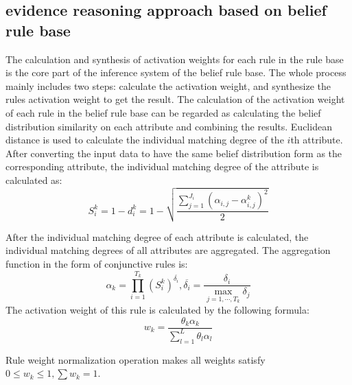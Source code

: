 \documentclass{ieeeaccess}
\begin{document}
\subsection{evidence reasoning approach based on belief rule base}
The calculation and synthesis of activation weights for each rule in the rule base is the core part of the inference system of the belief rule base.
The whole process mainly includes two steps: calculate the activation weight, and synthesize the rules activation weight to get the result.
The calculation of the activation weight of each rule in the belief rule base can be regarded as calculating the belief distribution similarity on each attribute and combining the results.
Euclidean distance is used to calculate the individual matching degree of the $i$th attribute. After converting the input data to have the same belief distribution form as the corresponding attribute,
the individual matching degree of the attribute is calculated as:
\begin{equation}
    S_i^k=1-d_i^k=1-\sqrt{\frac{\sum_{j=1}^{J_i}(\alpha_{i,j}-\alpha_{i,j}^k)^2}{2}}
\end{equation}

After the individual matching degree of each attribute is calculated, the individual matching degrees of all attributes are aggregated. The aggregation function in the form of conjunctive rules is:
\begin{equation}
    \alpha_k=\prod_{i=1}^{T_k}(S_i^k)^{\overline{\delta_i}},\overline{\delta_i}=\frac{\delta_i}{\max_{j=1,\cdots,T_k}\delta_j}
\end{equation}
The activation weight of this rule is calculated by the following formula:
\begin{equation}
    w_k=\frac{\theta_k\alpha_k}{\sum_{l=1}^L\theta_l\alpha_l}
\end{equation}

Rule weight normalization operation makes all weights satisfy $0\leq w_k\leq 1,\sum w_k=1$.
\end{document}
